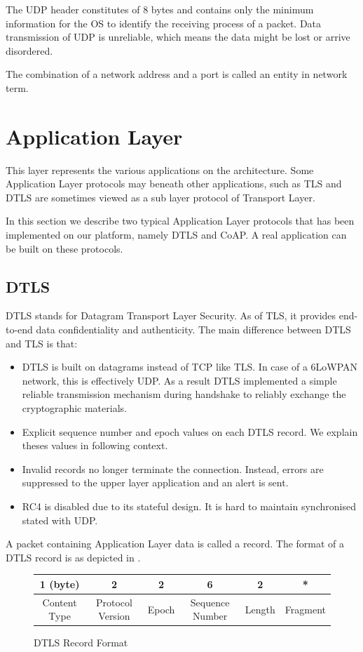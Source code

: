 The UDP header constitutes of 8 bytes and contains only the minimum information for the OS to identify the receiving process of a packet. Data transmission of UDP is unreliable, which means the data might be lost or arrive disordered.

The combination of a network address and a port is called an entity in network term.

\section{Application Layer}
This layer represents the various applications on the architecture. Some Application Layer protocols may beneath other applications, such as TLS and DTLS are sometimes viewed as a sub layer protocol of Transport Layer.

In this section we describe two typical Application Layer protocols that has been implemented on our platform, namely DTLS\cite{rfc6347} and CoAP\cite{rfc7252}. A real application can be built on these protocols.

\subsection{DTLS}
DTLS\cite{rfc6347} stands for Datagram Transport Layer Security. As of TLS, it provides end-to-end data confidentiality and authenticity. The main difference between DTLS and TLS is that:
\begin{itemize}
	\item DTLS is built on datagrams instead of TCP like TLS. In case of a 6LoWPAN network, this is effectively UDP. As a result DTLS implemented a simple reliable transmission mechanism during handshake to reliably exchange the cryptographic materials.
	\item Explicit sequence number and epoch values on each DTLS record. We explain theses values in following context.
	\item Invalid records no longer terminate the connection. Instead, errors are suppressed to the upper layer application and an alert is sent.
	\item RC4 is disabled due to its stateful design\cite{DtlsCiphers}. It is hard to maintain synchronised stated with UDP.
\end{itemize}

A packet containing Application Layer data is called a record. The format of a DTLS record is as depicted in .
\begin{figure}[h!]
	\center
	\begin{tabular}{|c|c|c|c|c|c|}
		\hline
		1 (byte)     & 2                & 2     & 6               & 2      & *        \\ \hline
		Content Type & Protocol Version & Epoch & Sequence Number & Length & Fragment \\ \hline
	\end{tabular}
	\caption{DTLS Record Format}
	\label{Fig: DTLS Record Format}
\end{figure}


